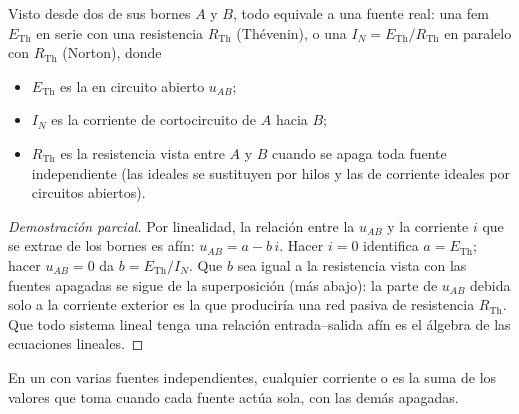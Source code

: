 \begin{theorem}\label{thm:b1:dc-circuits:thevenin}
Visto desde dos de sus bornes $A$ y $B$, todo  equivale a
una fuente real: una fem $E_{\mathrm{Th}}$ en serie con una resistencia
$R_{\mathrm{Th}}$ (Thévenin), o una  $I_N =
E_{\mathrm{Th}}/R_{\mathrm{Th}}$ en paralelo con $R_{\mathrm{Th}}$
(Norton), donde
\begin{itemize}
  \item $E_{\mathrm{Th}}$ es la  en circuito abierto $u_{AB}$;
  \item $I_N$ es la corriente de cortocircuito de $A$ hacia $B$;
  \item $R_{\mathrm{Th}}$ es la resistencia vista entre $A$ y $B$ cuando
        se apaga toda fuente independiente (las 
        ideales se sustituyen por hilos y las de corriente ideales por
        circuitos abiertos).
\end{itemize}
\end{theorem}

\begin{proof}[Demostración parcial]
Por linealidad, la relación entre la  $u_{AB}$ y la corriente $i$
que se extrae de los bornes es afín: $u_{AB} = a - b\,i$. Hacer $i = 0$
identifica $a = E_{\mathrm{Th}}$; hacer $u_{AB} = 0$ da
$b = E_{\mathrm{Th}}/I_N$. Que $b$ sea igual a la resistencia vista con
las fuentes apagadas se sigue de la superposición (más abajo): la parte de
$u_{AB}$ debida solo a la corriente exterior es la que produciría una red
pasiva de resistencia $R_{\mathrm{Th}}$. Que todo sistema lineal tenga una
relación entrada--salida afín es el álgebra de las ecuaciones lineales.
\end{proof}

\begin{theorem}[Superposición]\label{thm:b1:dc-circuits:superposition}
En un  con varias fuentes independientes, cualquier
corriente o  es la suma de los valores que toma cuando cada fuente
actúa sola, con las demás apagadas.
\end{theorem}

